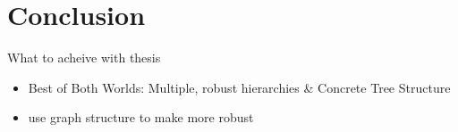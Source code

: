 \documentclass[rgb]{beamer}
\begin{document}
\section{Conclusion}
\begin{frame}{What to acheive with thesis}
    \begin{itemize}
        \item Best of Both Worlds: Multiple, robust hierarchies \& Concrete Tree Structure 
        \item use graph structure to make more robust
    \end{itemize}
\end{frame}{}
\end{document}
